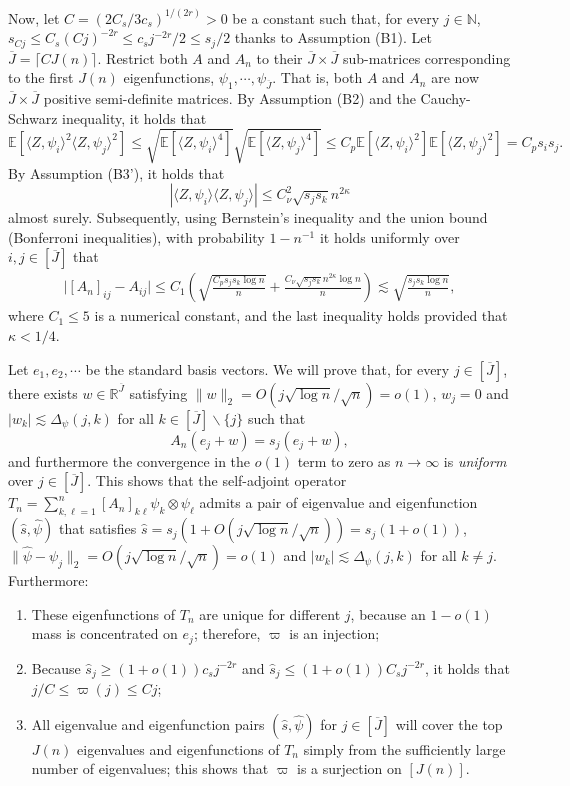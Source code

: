\documentclass[11pt,a4paper]{article}
\renewcommand{\hat}{\widehat}
\renewcommand{\bar}{\overline}
\theoremstyle{definition}
\theoremstyle{plain}
\theoremstyle{remark}
\begin{document}
Now, let $C=(2C_s/3c_s)^{1/(2r)}>0$ be a constant such that, for every $j\in\mathbb N$, $s_{Cj}\leq C_s (Cj)^{-2r} \leq c_sj^{-2r}/2\leq s_j/2$ thanks to Assumption (B1). 
Let $\bar J=\lceil CJ(n)\rceil$.
Restrict both $A$ and $A_n$ to their $\bar J\times \bar J$ sub-matrices corresponding to the first $J(n)$ eigenfunctions, $\psi_1,\cdots,\psi_{\bar J}$.
That is, both $A$ and $A_n$ are now $\bar J\times\bar J$ positive semi-definite matrices.
By Assumption (B2) and the Cauchy-Schwarz inequality, it holds that 
$$
\mathbb E[\langle Z,\psi_i\rangle^2\langle Z,\psi_j\rangle^2] \leq \sqrt{\mathbb E[\langle Z,\psi_i\rangle^4]}\sqrt{\mathbb E[\langle Z,\psi_j\rangle^4]}
\leq C_p\mathbb E[\langle Z,\psi_i\rangle^2]\mathbb E[\langle Z,\psi_j\rangle^2] = C_ps_is_j.
$$
By Assumption (B3'), it holds that 
$$
|\langle Z,\psi_i\rangle\langle Z,\psi_j\rangle| \leq C_\nu^2\sqrt{s_js_k}n^{2\kappa}
$$ almost surely.
Subsequently, using Bernstein's inequality and the union bound (Bonferroni inequalities), with probability $1-n^{-1}$ it holds uniformly over $i,j\in[\bar J]$ that 
\begin{align}
\big|[A_n]_{ij}-A_{ij}\big| \leq C_1\left(\sqrt{\frac{C_ps_js_k\log n}{n}} + \frac{C_\nu\sqrt{s_js_k}n^{2\kappa}\log n}{n}\right) \lesssim \sqrt{\frac{s_js_k\log n}{n}},
\label{eq:proof-stability-1}
\end{align}
where $C_1\leq 5$ is a numerical constant, and the last inequality holds provided that $\kappa<1/4$.

Let $e_1,e_2,\cdots$ be the standard basis vectors.
We will prove that, for every $j\in[\bar J]$, there exists $w\in\mathbb R^{\bar J}$ satisfying $\|w\|_2 = O(j\sqrt{\log n}/\sqrt{n})=o(1)$, $w_j=0$ and $|w_k|\lesssim \Delta_\psi(j,k)$ for all $k\in[\bar J]\backslash\{j\}$ such that
\begin{equation}
A_n (e_j+w) = s_j(e_j+w),
\label{eq:eigen-an}
\end{equation}
and furthermore the convergence in the $o(1)$ term to zero as $n\to\infty$ is \emph{uniform} over $j\in[\bar J]$.
This shows that the self-adjoint operator $T_n=\sum_{k,\ell=1}^{n}[A_n]_{k\ell}\psi_k\otimes\psi_\ell$ admits a pair of eigenvalue and eigenfunction $(\hat s,\hat\psi)$ that satisfies
$\hat s=s_j(1+O(j\sqrt{\log n}/\sqrt{n}))=s_j(1+o(1))$, $\|\hat\psi-\psi_j\|_2=O(j\sqrt{\log n}/\sqrt{n})=o(1)$ and $|w_k|\lesssim \Delta_\psi(j,k)$ for all $k\neq j$. 
Furthermore:
\begin{enumerate}
\item These eigenfunctions of $T_n$ are unique for different $j$, because an $1-o(1)$ mass is concentrated on $e_j$; therefore, $\varpi$ is an injection;
\item Because $\hat s_j \geq (1+o(1))c_s j^{-2r}$ and $\hat s_j\leq (1+o(1))C_s j^{-2r}$, it holds that $j/C\leq \varpi(j)\leq Cj$;
\item All eigenvalue and eigenfunction pairs $(\hat s,\hat\psi)$ for $j\in[\bar J]$ will cover the top $J(n)$ eigenvalues and eigenfunctions of $T_n$ simply from the sufficiently large number of eigenvalues;
this shows that $\varpi$ is a surjection on $[J(n)]$.
\end{enumerate}
\end{document}
